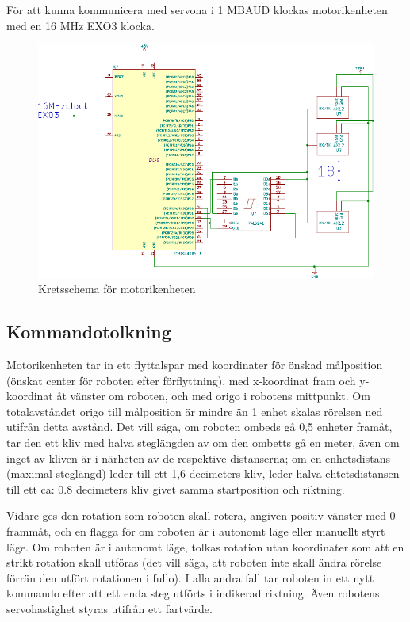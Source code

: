 \documentclass[a4paper,titlepage,12pt]{article}
\begin{document}
	För att kunna kommunicera med servona i 1 MBAUD klockas motorikenheten med en 16 MHz 
	EXO3 klocka.

	\begin{figure}[htpb]
		\centering
		\includegraphics[width=1.0\linewidth]{charts/motor/motorik.pdf}
		\caption{Kretsschema för motorikenheten}
		\label{fig:motorik}
	\end{figure}
	
		\subsection{Kommandotolkning}
	Motorikenheten  tar in ett flyttalspar med koordinater för önskad målposition (önskat 
	center för roboten efter förflyttning), med x-koordinat fram och 
	y-koordinat åt vänster om roboten, och med origo i robotens mittpunkt. Om totalavståndet 
	origo till målposition är mindre än 1 enhet skalas rörelsen ned utifrån detta avstånd. 
	Det vill säga, om roboten ombeds gå 0,5 enheter framåt, tar den ett kliv med halva 
	steglängden av om den ombetts gå en meter, även om inget av kliven är i närheten av 
	de respektive distanserna; om en enhetsdistans (maximal steglängd) leder till ett 
	1,6 decimeters kliv, leder halva ehtetsdistansen till ett ca: 0.8 decimeters kliv givet samma 
	startposition och riktning. 
	
	Vidare ges den rotation som roboten 
	skall rotera, angiven positiv vänster med 0 frammåt, och en flagga för om 
	roboten är i autonomt läge eller manuellt styrt läge. Om roboten är i autonomt läge, tolkas 
	rotation utan koordinater som att en strikt rotation skall utföras (det vill säga, att 
	roboten inte skall ändra rörelse förrän den utfört rotationen i fullo). I alla andra fall 
	tar roboten in ett nytt kommando efter att ett enda steg utförts i indikerad riktning. 
	Även robotens servohastighet styras utifrån ett fartvärde. 
\end{document}
